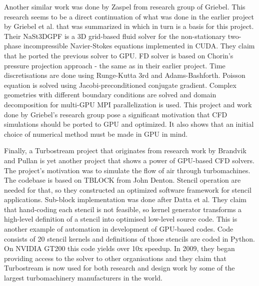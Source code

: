 Another similar work was done by Zaspel from research group of Griebel. This research seems to be a direct continuation of what was done in the earlier project by Griebel et al. that was summarized in \cite{griebel1998numerical} which in turn is a basis for this project. Their NaSt3DGPF is a 3D grid-based fluid solver for the non-stationary two-phase incompressible Navier-Stokes equations implemented in CUDA. They claim that he ported the previous solver to GPU. FD solver is based on Chorin's pressure projection approach - the same as in their earlier project. Time discretisations are done using Runge-Kutta 3rd and Adams-Bashforth. Poisson equation is solved using Jacobi-preconditioned conjugate gradient. Complex geometries with different boundary conditions are solved and domain decomposition for multi-GPU MPI parallelization is used. This project and work done by Griebel's research group pose a significant motivation that CFD simulations should be ported to GPU and optimized. It also shows that an initial choice of numerical method must be made in GPU in mind.\cite{zaspel2010multi, zaspel2012web, zaspel2012gpu, zaspel2012solving}

Finally, a Turbostream project that originates from research work by Brandvik and Pullan is yet another project that shows a power of GPU-based CFD solvers. The project's motivation was to simulate the flow of air through turbomachines. The codebase is based on TBLOCK from John Denton. Stencil operation are needed for that, so they constructed an optimized software framework for stencil applications. Sub-block implementation was done after Datta et al.\cite{datta2008stencil, datta2009auto} They claim that hand-coding each stencil is not feasible, so kernel generator transforms a high-level definition of a stencil into optimised low-level source code. This is another example of automation in development of GPU-based codes. Code consists of 20 stencil kernels and definitions of those stencils are coded in Python. On NVIDIA GT200 this code yields over 10x speedup. In 2009, they began providing access to the solver to other organisations and they claim that Turbostream is now used for both research and design work by some of the largest turbomachinery manufacturers in the world.\cite{turbostream2012web, brandvik2009acc, brandvik2010sblock, zaspel2012solving}